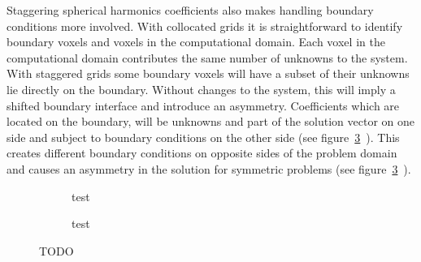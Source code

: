 Staggering spherical harmonics coefficients also makes handling boundary conditions more involved. With collocated grids it is straightforward to identify boundary voxels and voxels in the computational domain. Each voxel in the computational domain contributes the same number of unknowns to the system. With staggered grids some boundary voxels will have a subset of their unknowns lie directly on the boundary. Without changes to the system, this will imply a shifted boundary interface and introduce an asymmetry. Coefficients which are located on the boundary, will be unknowns and part of the solution vector on one side and subject to boundary conditions on the other side (see figure~\ref{fig:pn_staggered_grid_unhandled_bc}~). This creates different boundary conditions on opposite sides of the problem domain and causes an asymmetry in the solution for symmetric problems (see figure~\ref{fig:pn_staggered_grid_unhandled_bc}~).
\begin{figure}[h]
\centering
\begin{subfigure}{0.49\columnwidth}
\caption{test}
\label{fig:pn_staggering_asymmetry_bc}
\end{subfigure}%
\hspace{0.01\columnwidth}
\begin{subfigure}{0.49\columnwidth}
\caption{test}
\label{fig:pn_staggering_asymmetry_bc_checkerboard}
\end{subfigure}%
\caption{TODO}
\label{fig:pn_staggered_grid_unhandled_bc}
\end{figure}

